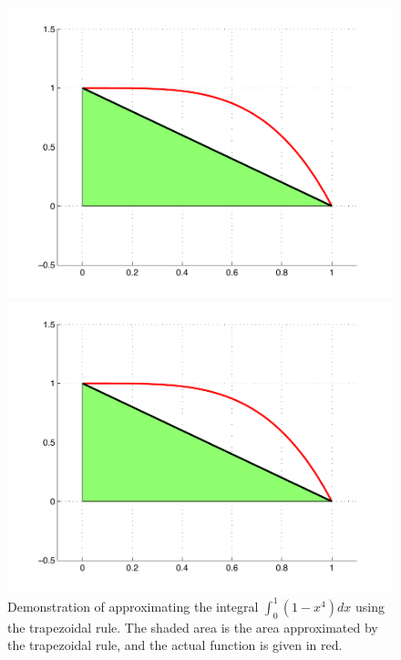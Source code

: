 \begin{figure}
\begin{center}
\begin{matlab}
\includegraphics[scale=.3]{./FiguresMAT/Trapezoid.pdf}
\end{matlab}
\begin{python}
\includegraphics[scale=.3]{./FiguresMAT/Trapezoid.pdf}
\end{python}
\caption{Demonstration of approximating the integral $\int_0^1 (1-x^4)dx$ using the trapezoidal rule. The shaded area is the area approximated by the trapezoidal rule, and the actual function is given in red.}
\label{Fig:Trapezoidal}
\end{center}
\end{figure}

